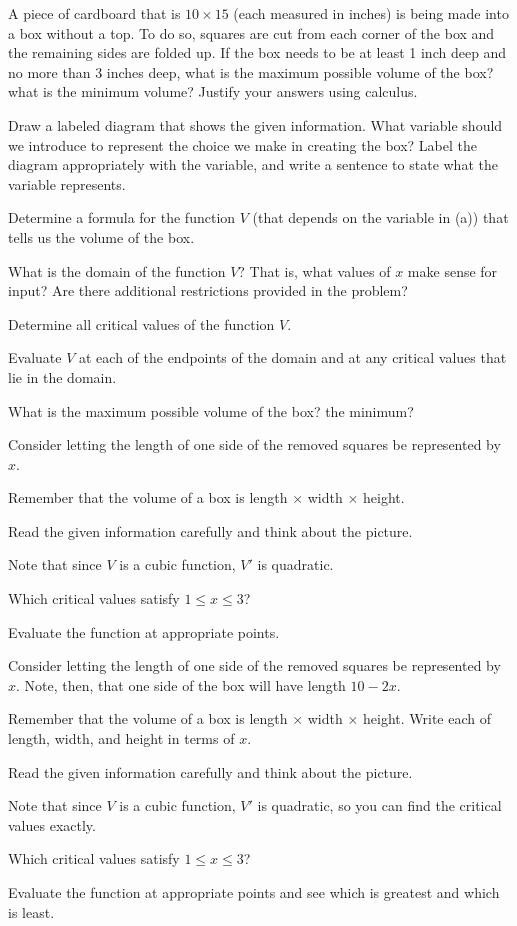 \begin{activity} \label{A:3.3.3}  A piece of cardboard that is $10 \times 15$ (each measured in inches) is being made into a box without a top.  To do so,
squares are cut from each corner of the box and the remaining sides are folded up.  If the box needs to be at least 1 inch deep and no more than 3 inches deep, what is the maximum possible volume of the box?  what is the minimum volume?  Justify your answers using calculus.
\ba
	\item Draw a labeled diagram that shows the given information.  What variable should we introduce to represent the choice we make in creating the box?  Label the diagram appropriately with the variable, and write a sentence to state what the variable represents.
	\item Determine a formula for the function $V$ (that depends on the variable in (a)) that tells us the volume of the box.
	\item What is the domain of the function $V$?  That is, what values of $x$ make sense for input?  Are there additional restrictions provided in the problem?
	\item Determine all critical values of the function $V$.
	\item Evaluate $V$ at each of the endpoints of the domain and at any critical values that lie in the domain.
	\item What is the maximum possible volume of the box?  the minimum?
\ea
\end{activity}
\begin{smallhint}
\ba
	\item Consider letting the length of one side of the removed squares be represented by $x$.
	\item Remember that the volume of a box is length $\times$ width $\times$ height.
	\item Read the given information carefully and think about the picture.
	\item Note that since $V$ is a cubic function, $V'$ is quadratic.
	\item Which critical values satisfy $1 \le x \le 3$?
	\item Evaluate the function at appropriate points.
\ea
\end{smallhint}
\begin{bighint}
\ba
	\item Consider letting the length of one side of the removed squares be represented by $x$.  Note, then, that one side of the box will have length $10 - 2x$.
	\item Remember that the volume of a box is length $\times$ width $\times$ height.  Write each of length, width, and height in terms of $x$.
	\item Read the given information carefully and think about the picture.
	\item Note that since $V$ is a cubic function, $V'$ is quadratic, so you can find the critical values exactly.
	\item Which critical values satisfy $1 \le x \le 3$?
	\item Evaluate the function at appropriate points and see which is greatest and which is least.
\ea
\end{bighint}
